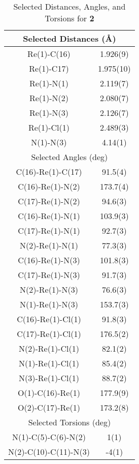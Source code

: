 \begin{table}[htbp]
  \caption{Selected Distances, Angles, and Torsions for \textbf{2}}
  \centering
    \begin{tabular}{cc}
    \toprule
    \multicolumn{2}{c}{Selected Distances (\r{A})} \\
    \midrule
    Re(1)-C(16) & 1.926(9) \\
    Re(1)-C17) & 1.975(10) \\
    Re(1)-N(1) & 2.119(7) \\
    Re(1)-N(2) & 2.080(7) \\
    Re(1)-N(3) & 2.126(7) \\
    Re(1)-Cl(1) & 2.489(3) \\
    N(1)-N(3) & 4.14(1) \\ \midrule
    \multicolumn{2}{c}{Selected Angles (deg)} \\ \midrule
    C(16)-Re(1)-C(17) & 91.5(4) \\
    C(16)-Re(1)-N(2) & 173.7(4) \\
    C(17)-Re(1)-N(2) & 94.6(3) \\
    C(16)-Re(1)-N(1) & 103.9(3) \\
    C(17)-Re(1)-N(1) & 92.7(3) \\
    N(2)-Re(1)-N(1) & 77.3(3) \\
    C(16)-Re(1)-N(3) & 101.8(3) \\
    C(17)-Re(1)-N(3) & 91.7(3) \\
    N(2)-Re(1)-N(3) & 76.6(3) \\
    N(1)-Re(1)-N(3) & 153.7(3) \\
    C(16)-Re(1)-Cl(1) & 91.8(3) \\
    C(17)-Re(1)-Cl(1) & 176.5(2) \\
    N(2)-Re(1)-Cl(1) & 82.1(2) \\
    N(1)-Re(1)-Cl(1) & 85.4(2) \\
    N(3)-Re(1)-Cl(1) & 88.7(2) \\
    O(1)-C(16)-Re(1) & 177.9(9) \\
    O(2)-C(17)-Re(1) & 173.2(8) \\ \midrule
    \multicolumn{2}{c}{Selected Torsions (deg)} \\ \midrule
    N(1)-C(5)-C(6)-N(2) & 1(1) \\
    N(2)-C(10)-C(11)-N(3) & -4(1) \\
    \bottomrule
    \end{tabular}%
  \label{tab.da2}%
\end{table}%



